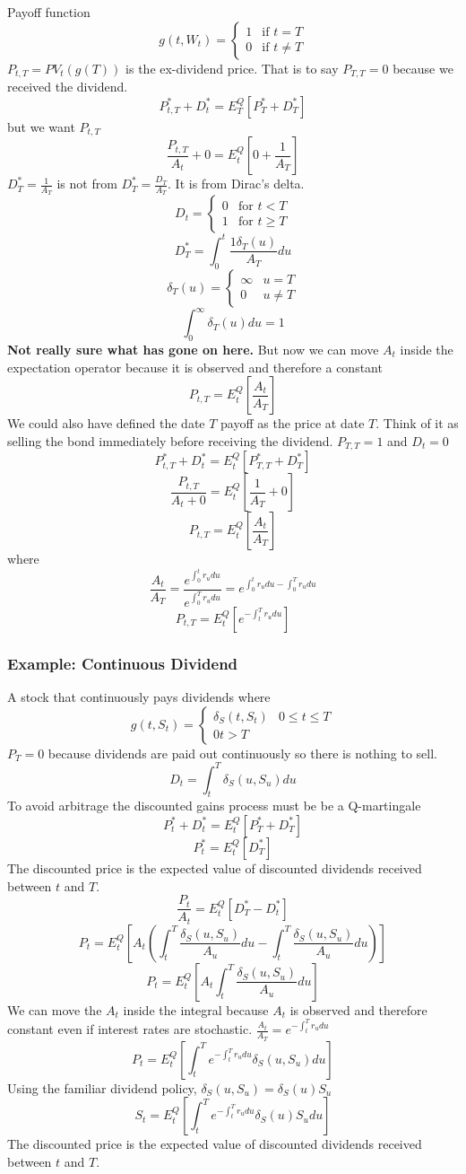 \documentclass[12pt]{article}
\begin{document}
Payoff function
$$g(t,W_t)=\begin{cases} 1 & \text{if }t=T \\ 0 & \text{if }t\neq T\end{cases}$$
$P_{t,T}=PV_t(g(T))$ is the ex-dividend price. That is to say $P_{T,T}=0$
because we received the dividend.
$$P_{t,T}^*+D_t^*=E_T^Q[P_T^*+D_T^*]$$
but we want $P_{t,T}$
$$\frac{P_{t,T}}{A_t}+0=E_t^Q\left[ 0+\frac{1}{A_T} \right] $$
$D_T^*=\frac{1}{A_T}$ is not from $D_T^*=\frac{D_T}{A_T}$. It is from Dirac's
delta.
$$D_t=\begin{cases} 0 & \text{for }t<T \\ 1 & \text{for }t\geq T \end{cases}$$
$$D_T^*=\int_0^t\frac{1\delta_T(u)}{A_T}du$$
$$\delta_T(u)=\begin{cases}\infty & u=T \\ 0 & u\neq T\end{cases}$$
$$\int_0^{\infty}\delta_T(u)du=1$$
\textbf{Not really sure what has gone on here.}
But now we can move $A_t$ inside the expectation operator because it is
observed and therefore a constant
$$P_{t,T}=E_t^Q\left[ \frac{A_t}{A_T} \right] $$
We could also have defined the date $T$ payoff as the price at date $T$. Think
of it as selling the bond immediately before receiving the dividend.
$P_{T,T}=1$ and $D_t=0$
$$P_{t,T}^*+D_t^*=E_t^Q[P_{T,T}^*+D_T^*]$$
$$\frac{P_{t,T}}{A_t+0}=E_t^Q\left[ \frac{1}{A_T}+0\right] $$
$$P_{t,T}=E_t^Q\left[ \frac{A_t}{A_T}\right]$$
where
$$\frac{A_t}{A_T}=\frac{e^{\int_0^tr_udu}}{e^{\int_0^Tr_udu}}=
e^{\int_0^tr_udu-\int_0^Tr_udu}$$
$$P_{t,T}=E_t^Q\left[ e^{-\int_t^Tr_udu}\right]$$

\subsubsection{Example: Continuous Dividend}

A stock that continuously pays dividends where
$$g(t,S_t)=\begin{cases}\delta_S(t,S_t) & 0\leq t\leq T \\ 0 t>T\end{cases}$$
$P_T=0$ because dividends are paid out continuously so there is nothing to
sell.
$$D_t=\int_t^T\delta_S(u,S_u)du$$
To avoid arbitrage the discounted gains process must be be a Q-martingale
$$P_t^*+D_t^*=E_t^Q[P_T^*+D_T^*]$$
$$P_t^*=E_t^Q[D_T^*]$$
The discounted price is the expected value of discounted dividends received
between $t$ and $T$.
$$\frac{P_t}{A_t}=E_t^Q[D_T^*-D_t^*]$$
$$P_t=E_t^Q\left[ A_t\left( \int_t^T\frac{\delta_S(u,S_u)}{A_u}du
-\int_t^T\frac{\delta_S(u,S_u)}{A_u}du\right) \right]$$
$$P_t=E_t^Q\left[A_t\int_t^T\frac{\delta_S(u,S_u)}{A_u}du\right]$$
We can move the $A_t$ inside the integral because $A_t$ is observed and
therefore constant even if interest rates are stochastic.
$\frac{A_t}{A_T}=e^{-\int_t^Tr_udu}$
$$P_t=E_t^Q\left[ \int_t^Te^{-\int_t^Tr_udu}\delta_S(u,S_u)du\right]$$
Using the familiar dividend policy, $\delta_S(u,S_u)=\delta_S(u)S_u$
$$S_t=E_t^Q\left[ \int_t^Te^{-\int_t^Tr_udu}\delta_S(u)S_udu\right]$$
The discounted price is the expected value of discounted dividends received
between $t$ and $T$.
\end{document}
